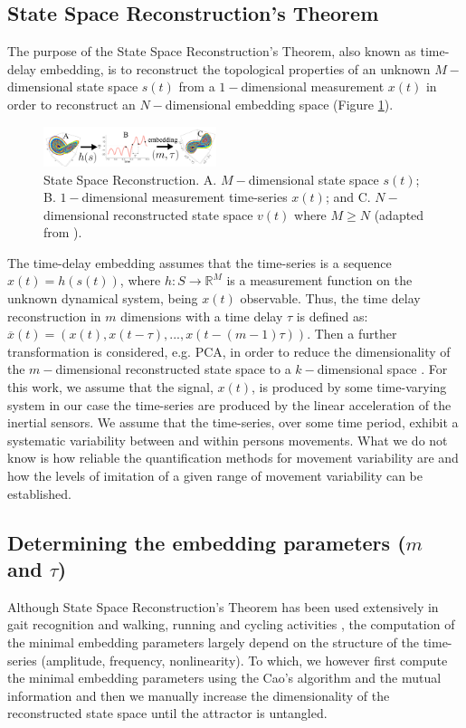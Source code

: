 \documentclass{sigchi}
\begin{document}
\subsection{State Space Reconstruction's Theorem}
The purpose of the State Space Reconstruction's Theorem, also known as
time-delay embedding, is to reconstruct the topological properties of an
unknown $M-$dimensional state space $s(t)$ from a $1-$dimensional measurement
$x(t)$ in order to reconstruct an $N-$dimensional embedding space
(Figure \ref{fig:takens_theorem}).
\begin{figure}
\centering
\includegraphics[width=0.45\textwidth]{figures/reconstructed_state_space/fig}
\caption[PA]{State Space Reconstruction. A. $M-$dimensional state space $s(t)$; B. $1-$dimensional measurement
time-series $x(t)$; and  C. $N-$dimensional reconstructed state space $v(t)$
where $M \geq N$ (adapted from \cite{QuintanaDuque2012}).}
\label{fig:takens_theorem}
\end{figure}
The time-delay embedding assumes that the time-series is a sequence $x(t)=h(s(t))$,
where $h: S \rightarrow \mathbb{R}^M$ is a measurement function on the unknown
dynamical system, being $x(t)$ observable.
Thus, the time delay reconstruction in $m$ dimensions with a time delay
$\tau$ is defined as: $\overline{x}(t) = (x(t), x(t-\tau),...,x(t-(m-1)\tau))$.
Then a further transformation is considered, e.g. PCA, in order to reduce
the dimensionality of the $m-$dimensional reconstructed state space
to a $k-$dimensional space \cite{Uzal2011}.
For this work, we assume that the signal, $x(t)$, is produced by some time-varying
system in our case the time-series are produced by the linear acceleration of
the inertial sensors.
We assume that the time-series, over some time period, exhibit a systematic
variability between and within persons movements.
What we do not know is how reliable the quantification methods for movement variability are
and how the levels of imitation of a given range of movement variability can be established.


\subsection{Determining the embedding parameters ($m$ and $\tau$)}
Although State Space Reconstruction's Theorem has been used extensively in gait
recognition and walking, running and cycling activities \cite{Frank2010,Sama2013},
the computation of the minimal embedding parameters largely depend on the
structure of the time-series (amplitude, frequency, nonlinearity).
To which, we however first compute the minimal embedding parameters
using the Cao's algorithm \cite{Cao1997} and the mutual information
and then we manually increase the dimensionality of the reconstructed state
space until the attractor is untangled.
\end{document}

